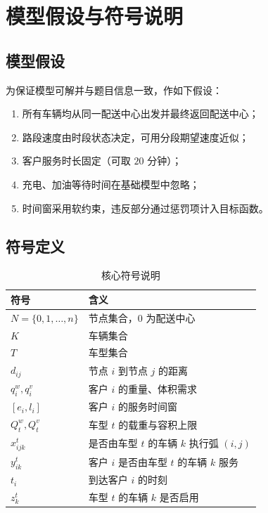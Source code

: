 \section{模型假设与符号说明}

\subsection{模型假设}
为保证模型可解并与题目信息一致，作如下假设：
\begin{enumerate}[label=\arabic*)]
    \item 所有车辆均从同一配送中心出发并最终返回配送中心；
    \item 路段速度由时段状态决定，可用分段期望速度近似；
    \item 客户服务时长固定（可取 $20$ 分钟）；
    \item 充电、加油等待时间在基础模型中忽略；
    \item 时间窗采用软约束，违反部分通过惩罚项计入目标函数。
\end{enumerate}

\subsection{符号定义}
\begin{table}[H]
\centering
\caption{核心符号说明}
\begin{tabular}{p{}p{}}
\toprule
符号 & 含义 \\
\midrule
$N=\{0,1,\dots,n\}$ & 节点集合，$0$ 为配送中心 \\
$K$ & 车辆集合 \\
$T$ & 车型集合 \\
$d_{ij}$ & 节点 $i$ 到节点 $j$ 的距离 \\
$q_i^w,q_i^v$ & 客户 $i$ 的重量、体积需求 \\
$[e_i,l_i]$ & 客户 $i$ 的服务时间窗 \\
$Q_t^w,Q_t^v$ & 车型 $t$ 的载重与容积上限 \\
$x_{ijk}^t$ & 是否由车型 $t$ 的车辆 $k$ 执行弧 $(i,j)$ \\
$y_{ik}^t$ & 客户 $i$ 是否由车型 $t$ 的车辆 $k$ 服务 \\
$t_i$ & 到达客户 $i$ 的时刻 \\
$z_k^t$ & 车型 $t$ 的车辆 $k$ 是否启用 \\
\bottomrule
\end{tabular}
\end{table}
